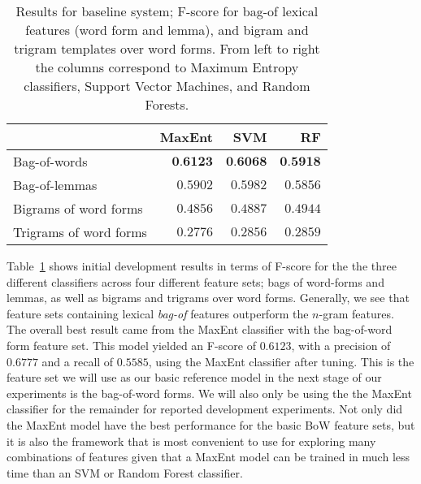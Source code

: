 \documentclass[11pt,letterpaper]{article}
\begin{document}
\begin{table}
  \begin{smaller}
    \begin{center}
      \begin{tabular}{lrrr}
        \toprule

        & MaxEnt & SVM & RF \\
        \midrule
        Bag-of-words & $\textbf{0.6123}$ & $\textbf{0.6068}$ & $\textbf{0.5918}$ \\ %
        Bag-of-lemmas & $0.5902$ & $0.5982$ & $0.5856$ \\
        Bigrams of word forms & $0.4856$ & $0.4887$ & $0.4944$ \\
        Trigrams of word forms & $0.2776$ & $0.2856$ & $0.2859$ \\      
      
        \bottomrule
      \end{tabular}
    \end{center}
    \caption{Results for baseline system; F-score for bag-of lexical features
      (word form and lemma), and bigram and trigram templates over word
      forms. From left to right the columns correspond to Maximum Entropy
      classifiers, Support Vector Machines, and Random Forests.}
    \label{tab:baseline}
  \end{smaller}
\end{table}

Table~\ref{tab:baseline} shows initial development results in terms of F-score for the the three different classifiers across four different feature sets; bags of word-forms and lemmas, as well as bigrams and trigrams over word forms. Generally, we see that feature sets containing lexical \emph{bag-of} features outperform the $n$-gram features. The overall best result came from the MaxEnt classifier with the bag-of-word form feature set. This model yielded an F-score of $0.6123$, with a precision of $0.6777$ and a recall of $0.5585$, using the MaxEnt classifier after tuning. This is the feature set we will use as our basic reference model in the next stage of our experiments is the bag-of-word forms. We will also only be using the the MaxEnt classifier for the remainder for reported development experiments. Not only did the MaxEnt model have the best performance for the basic BoW feature sets, but it is also the framework that is most convenient to use for exploring many combinations of features given that a MaxEnt model can be trained in much less time than an SVM or Random Forest classifier.
\end{document}
